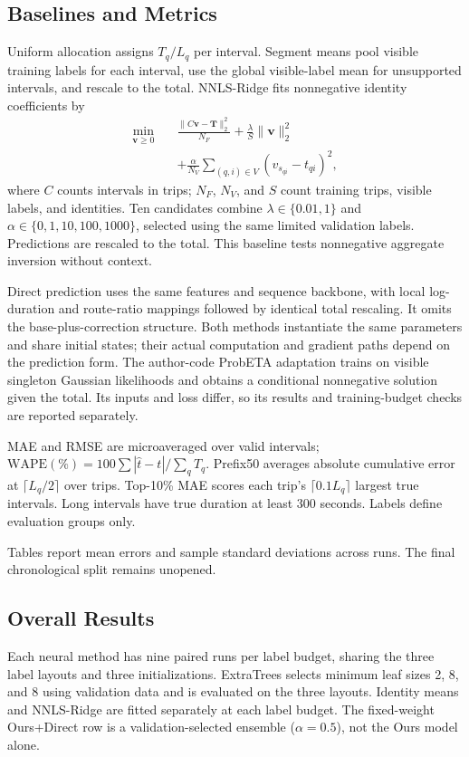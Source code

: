 \subsection{Baselines and Metrics}
Uniform allocation assigns $T_q/L_q$ per interval. Segment means pool visible training labels for each interval, use the global visible-label mean for unsupported intervals, and rescale to the total. NNLS-Ridge fits nonnegative identity coefficients by
\begin{align}
\min_{\boldsymbol v\geq0}\quad&
\frac{\|C\boldsymbol v-\boldsymbol T\|_2^2}{N_F}
+\frac{\lambda}{S}\|\boldsymbol v\|_2^2\nonumber\\
&+\frac{\alpha}{N_V}\sum_{(q,i)\in V}(v_{s_{qi}}-t_{qi})^2,
\label{eq:inverse}
\end{align}
where $C$ counts intervals in trips; $N_F$, $N_V$, and $S$ count training trips, visible labels, and identities. Ten candidates combine $\lambda\in\{0.01,1\}$ and $\alpha\in\{0,1,10,100,1000\}$, selected using the same limited validation labels. Predictions are rescaled to the total. This baseline tests nonnegative aggregate inversion without context.

Direct prediction uses the same features and sequence backbone, with local log-duration and route-ratio mappings followed by identical total rescaling. It omits the base-plus-correction structure. Both methods instantiate the same parameters and share initial states; their actual computation and gradient paths depend on the prediction form. The author-code ProbETA adaptation\cite{xu2025probeta} trains on visible singleton Gaussian likelihoods and obtains a conditional nonnegative solution given the total. Its inputs and loss differ, so its results and training-budget checks are reported separately.

MAE and RMSE are microaveraged over valid intervals; $\mathrm{WAPE}(\%)=100\sum|\hat t-t|/\sum_qT_q$. Prefix50 averages absolute cumulative error at $\lceil L_q/2\rceil$ over trips. Top-10\% MAE scores each trip's $\lceil0.1L_q\rceil$ largest true intervals. Long intervals have true duration at least 300 seconds. Labels define evaluation groups only.

Tables report mean errors and sample standard deviations across runs. The final chronological split remains unopened.

\subsection{Overall Results}


Each neural method has nine paired runs per label budget, sharing the three label layouts and three initializations. ExtraTrees selects minimum leaf sizes 2, 8, and 8 using validation data and is evaluated on the three layouts. Identity means and NNLS-Ridge are fitted separately at each label budget. The fixed-weight Ours+Direct row is a validation-selected ensemble ($\alpha=0.5$), not the Ours model alone.

